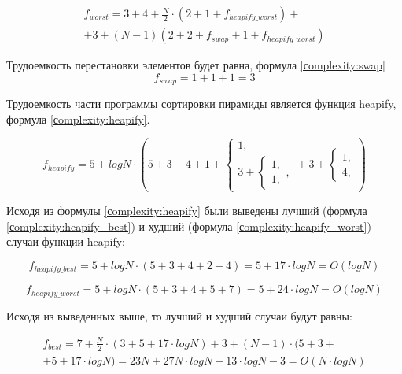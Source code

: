 \begin{equation}
	\label{сomplexity:heap_worst_t}
	\begin{aligned}
		f_{worst} = 3 + 4 + \frac{N}{2} \cdot (2 + 1 + f_{heapify\_worst}) + \\
		+ 3 + (N - 1)(2 + 2 + f_{swap} + 1 + f_{heapify\_worst})
	\end{aligned}
\end{equation}

Трудоемкость перестановки элементов будет равна, формула \ref{сomplexity:swap}
\begin{equation}
	\label{сomplexity:swap}
	f_{swap} = 1 + 1 + 1 = 3
\end{equation}

Трудоемкость части программы сортировки пирамиды является функция heapify, формула \ref{сomplexity:heapify}.

\begin{equation}
	\label{сomplexity:heapify}
	f_{heapify} = 5 + log N \cdot (5 + 3 + 4 + 1 + 
	\begin{cases}
		1, \\
		3 + \begin{cases}
			1, \\
			1,
		\end{cases},
	\end{cases} + 3 +
	\begin{cases}
		1, \\
		4,
	\end{cases})
\end{equation}

Исходя из формулы \ref{сomplexity:heapify} были выведены лучший (формула \ref{сomplexity:heapify_best}) и худший (формула \ref{сomplexity:heapify_worst}) случаи функции heapify:

\begin{equation}
	\label{сomplexity:heapify_best}
	f_{heapify\_best} = 5 + log N \cdot (5 + 3 + 4 + 2 + 4) = 5 + 17 \cdot log N = O(log N) 
\end{equation}

\begin{equation}
	\label{сomplexity:heapify_worst}
	f_{heapify\_worst} = 5 + log N \cdot (5 + 3 + 4 + 5 + 7) = 5 + 24 \cdot log N = O(log N) 
\end{equation}

Исходя из выведенных выше, то лучший и худший случаи будут равны: 

\begin{equation}
	\label{сomplexity:heap_best_p}
	\begin{aligned}
		f_{best} = 7 + \frac{N}{2} \cdot (3 + 5 + 17 \cdot log N) + 3 + (N - 1) \cdot (5 + 3 + \\ 
		+ 5 + 17 \cdot log N) = 23N + 27N \cdot log N - 13 \cdot log N - 3 = O(N \cdot log N)
	\end{aligned}
\end{equation}

